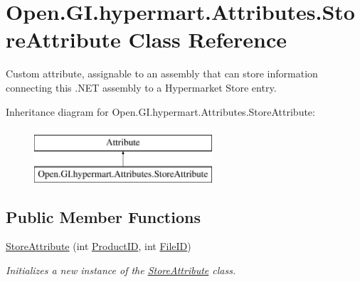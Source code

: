 \hypertarget{class_open_1_1_g_i_1_1hypermart_1_1_attributes_1_1_store_attribute}{}\section{Open.\+G\+I.\+hypermart.\+Attributes.\+Store\+Attribute Class Reference}
\label{class_open_1_1_g_i_1_1hypermart_1_1_attributes_1_1_store_attribute}


Custom attribute, assignable to an assembly that can store information connecting this .N\+ET assembly to a Hypermarket Store entry.  


Inheritance diagram for Open.\+G\+I.\+hypermart.\+Attributes.\+Store\+Attribute\+:\begin{figure}[H]
\begin{center}
\leavevmode
\includegraphics[height=2.000000cm]{class_open_1_1_g_i_1_1hypermart_1_1_attributes_1_1_store_attribute}
\end{center}
\end{figure}
\subsection*{Public Member Functions}
\begin{DoxyCompactItemize}
\item 
\hyperlink{class_open_1_1_g_i_1_1hypermart_1_1_attributes_1_1_store_attribute_a127c005e38f149d6c12fda40173ec7f1}{Store\+Attribute} (int \hyperlink{class_open_1_1_g_i_1_1hypermart_1_1_attributes_1_1_store_attribute_acf647c6eece8333d1d8d817474d5776d}{Product\+ID}, int \hyperlink{class_open_1_1_g_i_1_1hypermart_1_1_attributes_1_1_store_attribute_aa321f5e2ab58ed219e952f1e8036fcfa}{File\+ID})
\begin{DoxyCompactList}\small\item\em Initializes a new instance of the \hyperlink{class_open_1_1_g_i_1_1hypermart_1_1_attributes_1_1_store_attribute}{Store\+Attribute} class. \end{DoxyCompactList}\end{DoxyCompactItemize}
